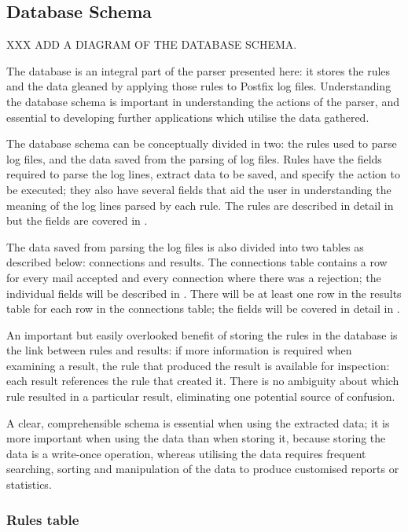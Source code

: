 \subsection{Database Schema}
\label{database schema}

XXX ADD A DIAGRAM OF THE DATABASE SCHEMA\@.

The database is an integral part of the parser presented here: it stores
the rules and the data gleaned by applying those rules to Postfix log
files.  Understanding the database schema is important in understanding the
actions of the parser, and essential to developing further applications
which utilise the data gathered.

The database schema can be conceptually divided in two: the rules used to
parse log files, and the data saved from the parsing of log files.  Rules
have the fields required to parse the log lines, extract data to be saved,
and specify the action to be executed; they also have several fields that
aid the user in understanding the meaning of the log lines parsed by each
rule.  The rules are described in detail in  but the
fields are covered in .

The data saved from parsing the log files is also divided into two tables
as described below: connections and results.  The connections table
contains a row for every mail accepted and every connection where there was
a rejection; the individual fields will be described in
.  There will be at least one row in the
results table for each row in the connections table; the fields will be
covered in detail in .

An important but easily overlooked benefit of storing the rules in the
database is the link between rules and results: if more information is
required when examining a result, the rule that produced the result is
available for inspection: each result references the rule that created it.
There is no ambiguity about which rule resulted in a particular result,
eliminating one potential source of confusion.

A clear, comprehensible schema is essential when using the extracted data;
it is more important when using the data than when storing it, because
storing the data is a write-once operation, whereas utilising the data
requires frequent searching, sorting and manipulation of the data to
produce customised reports or statistics.

\subsubsection{Rules table}

